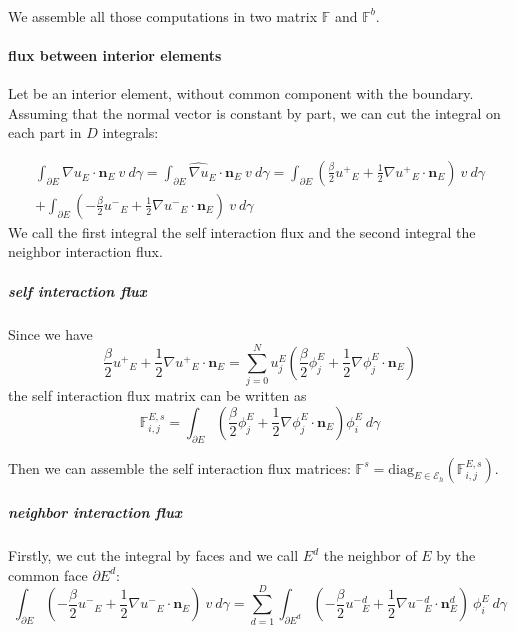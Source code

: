 \documentclass[a4paper,10pt]{article}
\begin{document}
\paragraph{}
We assemble all those computations in two matrix $\mathbb{F}$ and $\mathbb{F}^b$.

\iffalse

\paragraph{flux between interior elements}

Let be an interior element, without common component with the boundary. Assuming that the normal 
vector is constant by part, we can cut the integral on each part in $D$ integrals:

\begin{multline*}
 \int_{\partial E} \widehat{\nabla u}_E \cdot \mathbf{n}_E\ v\ d\gamma 
 = \int_{\partial E} \widehat{\nabla u}_E \cdot \mathbf{n}_E\ v\ d\gamma
 = \int_{\partial E} \left( \frac{\beta}{2} {u^+}_E + \frac{1}{2} \nabla {u^+}_E \cdot \mathbf{n}_E 
\right) \ v\ d\gamma \\
+ \int_{\partial E} \left( -\frac{\beta}{2} {u^-}_E + \frac{1}{2} \nabla {u^-}_E \cdot \mathbf{n}_E 
\right) \ v\ d\gamma
\end{multline*}
 We call the first integral the self interaction flux and the second integral the neighbor 
interaction flux.

\subparagraph{self interaction flux} 
Since we have
\begin{equation*}
 \frac{\beta}{2} {u^+}_E + \frac{1}{2} \nabla {u^+}_E \cdot \mathbf{n}_E = \sum_{j=0}^N u_j^E 
\left( \frac{\beta}{2} \phi_j^E + \frac{1}{2} \nabla \phi_j^E \cdot \mathbf{n}_E \right)
\end{equation*}
the self interaction flux matrix can be written as
\begin{equation*}
 \mathbb{F}_{i,j}^{E,s} = \int_{\partial E} \left( \frac{\beta}{2} \phi_j^E + \frac{1}{2} \nabla 
\phi_j^E \cdot \mathbf{n}_E \right) \phi_i^E \ d \gamma
\end{equation*}

Then we can assemble the self interaction flux matrices: $\mathbb{F}^s = {\mathrm{diag}}_{E 
\in \mathcal{E}_h} (\mathbb{F}_{i,j}^{E,s})$.

\subparagraph{neighbor interaction flux}
Firstly, we cut the integral by faces and we call $E^d$ the neighbor of $E$ by the common face 
$\partial E^d$:
\begin{equation*}
 \int_{\partial E} \left( -\frac{\beta}{2} {u^-}_E + \frac{1}{2} \nabla {u^-}_E \cdot \mathbf{n}_E 
\right) \ v\ d\gamma 
= \sum_{d=1}^D \int_{\partial E^d} \left( -\frac{\beta}{2} {u^-}_E^d + \frac{1}{2} \nabla {u^-}_E^d 
\cdot \mathbf{n}_E^d \right) \ \phi_i^E\ d\gamma
\end{equation*}
\end{document}
